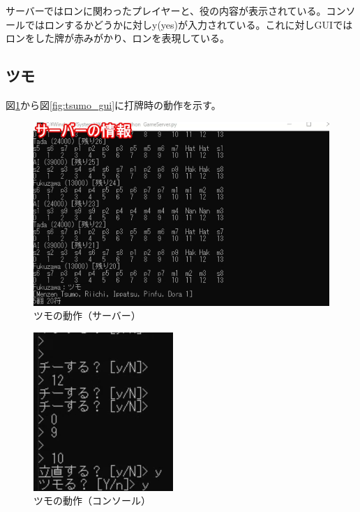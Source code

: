 \documentclass[a4j,titlepage]{jsarticle}
\begin{document}
サーバーではロンに関わったプレイヤーと、役の内容が表示されている。コンソールではロンするかどうかに対しy(yes)が入力されている。これに対しGUIではロンをした牌が赤みがかり、ロンを表現している。

\subsection{ツモ}
図\ref{fig:tsumo_server}から図\ref{fig:tsumo_gui}に打牌時の動作を示す。

\begin{figure}[htbp]
  \centering
  \includegraphics[width = 0.8\linewidth]{images/tsumo_server.png}
  \caption{ツモの動作（サーバー）}
  \label{fig:tsumo_server}
\end{figure}

\begin{figure}[htbp]
  \centering
  \includegraphics[width = 0.5\linewidth]{images/tsumo_console.png}
  \caption{ツモの動作（コンソール）}
  \label{fig:tsumo_console}
\end{figure}
\end{document}
